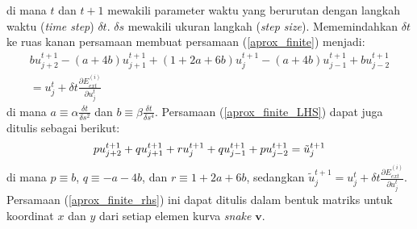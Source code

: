 di mana $t$ dan $t+1$ mewakili parameter waktu yang berurutan dengan langkah waktu (\emph{time step}) $\delta t$. $\delta s$ mewakili ukuran langkah (\emph{step size}). Mememindahkan $\delta t$ ke ruas kanan persamaan membuat persamaan (\ref{aprox_finite}) menjadi:
\begin{multline}
	\label{aprox_finite_LHS}
	b u^{t+1}_{j+2} - (a+4b) u^{t+1}_{j+1} + (1+2a+6b) u^{t+1}_{j} - (a+4b) u^{t+1}_{j-1} + b u^{t+1}_{j-2} \\
	= u^{t}_{j} + \delta t \frac{\partial E^{(i)}_{ext} }{ \partial u^{t}_{j}}
\end{multline}
di mana $a \equiv \alpha \frac{\delta t}{\delta s^2} $ dan $b \equiv \beta \frac{\delta t}{\delta s^4} $.
Persamaan (\ref{aprox_finite_LHS}) dapat juga ditulis sebagai berikut:
\begin{equation}
	\label{aprox_finite_rhs}
	p u^{t+1}_{j+2} + q u^{t+1}_{j+1} + r u^{t+1}_{j} + q u^{t+1}_{j-1} + p u^{t+1}_{j-2} \\
	= \tilde{u}^{t+1}_{j}
\end{equation}
di mana $p \equiv b$, $q \equiv -a-4b$, dan $r \equiv 1+2a+6b$, sedangkan $\tilde{u}^{t+1}_{j} = u^{t}_{j} + \delta t \frac{\partial E^{(i)}_{ext} }{ \partial u^{t}_{j}}$. Persamaan (\ref{aprox_finite_rhs}) ini dapat ditulis dalam bentuk matriks untuk koordinat $x$ dan $y$ dari setiap elemen kurva \emph{snake} $\textbf{v}$.



